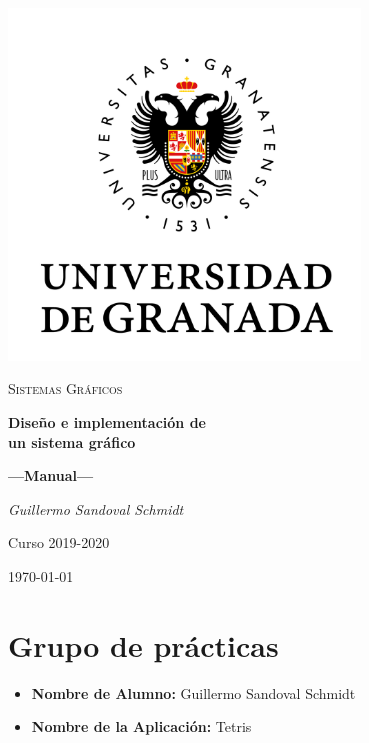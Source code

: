 \documentclass[11pt,a4paper]{article}
\begin{document}
\sloppy
\begin{titlepage}
  \centering
  \includegraphics[width=0.7\textwidth]{logo.png}\par\vspace{1cm}
  {\scshape\large Sistemas Gráficos \par} \vspace{1cm}
  {\huge\bfseries Diseño e implementación de \\ un sistema gráfico \par}
  \vspace{0.4cm}
  {\large\bfseries ---Manual---\\}
  \vspace{0.6cm}
  {\large\itshape  Guillermo Sandoval Schmidt  \par} \vspace{1.00cm}
  Curso 2019-2020 \\
  \vfill

  {\large \today\par}
\end{titlepage}

\tableofcontents
\thispagestyle{empty}

\newpage

\section{Grupo de prácticas}
\begin{itemize}
    \item \textbf{Nombre de Alumno:} Guillermo Sandoval Schmidt
    \item \textbf{Nombre de la Aplicación:} Tetris
\end{itemize}
\end{document}
